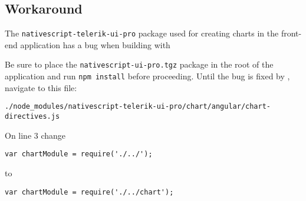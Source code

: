\subsection*{Workaround}
The \verb+nativescript-telerik-ui-pro+ package used for creating charts in the front-end application has a bug when building with 

Be sure to place the \verb+nativescript-ui-pro.tgz+ package in the root of the application and run \verb+npm install+ before proceeding.
Until the bug is fixed by , navigate to this file: 

\verb+./node_modules/nativescript-telerik-ui-pro/chart/angular/chart-directives.js+

On line 3 change 

\verb+var chartModule = require('./../');+

to

\verb+var chartModule = require('./../chart');+
